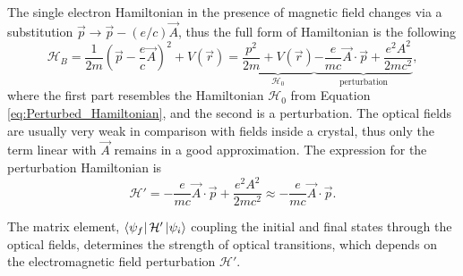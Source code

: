 \documentclass[titlepage,a4paper]{book}
\begin{document}
The single electron Hamiltonian in the presence of magnetic field changes via a substitution $\vec{p} \rightarrow \vec{p} - (e/c)\vec{A}$, thus the full form of Hamiltonian is the following
\begin{equation}
\label{eq:Perturbed_Hamiltonian2}
\mathcal{H}_{B} = \frac{1}{2m}\left( \vec{p} - \frac{e}{c}\vec{A}\right)^2 + V(\vec{r}) = \underbrace{\frac{p^2}{2m} + V(\vec{r})}_{\mathcal{H}_0} \underbrace{-\frac{e}{mc}\vec{A}\cdot\vec{p}+\frac{e^2 A^2}{2mc^2}}_{\text{perturbation}},
\end{equation}
where the first part resembles the Hamiltonian $\mathcal{H}_0$ from Equation \ref{eq:Perturbed_Hamiltonian}, and the second is a perturbation. The optical fields are usually very weak in comparison with fields inside a crystal, thus only the term linear with $\vec{A}$ remains in a good approximation. The expression for the perturbation Hamiltonian is
\begin{equation}
\label{eq:Perturbed_Hamiltonian3}
\mathcal{H}' = -\frac{e}{mc}\vec{A}\cdot\vec{p}+\frac{e^2 A^2}{2mc^2} \approx -\frac{e}{mc}\vec{A}\cdot\vec{p}.
\end{equation}

The matrix element, $\bra{\psi_f}\mathcal{H}'\ket{\psi_i}$ coupling the initial and final states through the optical fields, determines the strength of optical transitions, which depends on the electromagnetic field perturbation $\mathcal{H}'$.
\end{document}
